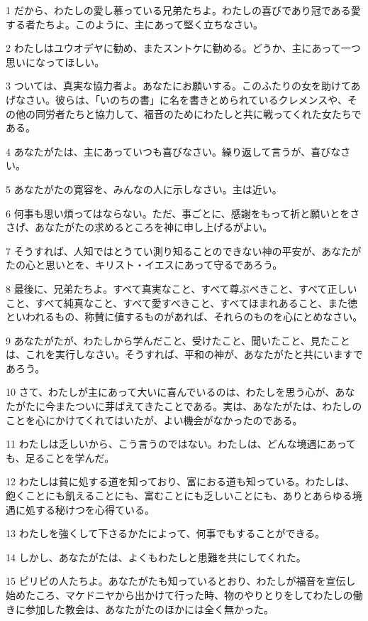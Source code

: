 \par 1 だから、わたしの愛し慕っている兄弟たちよ。わたしの喜びであり冠である愛する者たちよ。このように、主にあって堅く立ちなさい。
\par 2 わたしはユウオデヤに勧め、またスントケに勧める。どうか、主にあって一つ思いになってほしい。
\par 3 ついては、真実な協力者よ。あなたにお願いする。このふたりの女を助けてあげなさい。彼らは、「いのちの書」に名を書きとめられているクレメンスや、その他の同労者たちと協力して、福音のためにわたしと共に戦ってくれた女たちである。
\par 4 あなたがたは、主にあっていつも喜びなさい。繰り返して言うが、喜びなさい。
\par 5 あなたがたの寛容を、みんなの人に示しなさい。主は近い。
\par 6 何事も思い煩ってはならない。ただ、事ごとに、感謝をもって祈と願いとをささげ、あなたがたの求めるところを神に申し上げるがよい。
\par 7 そうすれば、人知ではとうてい測り知ることのできない神の平安が、あなたがたの心と思いとを、キリスト・イエスにあって守るであろう。
\par 8 最後に、兄弟たちよ。すべて真実なこと、すべて尊ぶべきこと、すべて正しいこと、すべて純真なこと、すべて愛すべきこと、すべてほまれあること、また徳といわれるもの、称賛に値するものがあれば、それらのものを心にとめなさい。
\par 9 あなたがたが、わたしから学んだこと、受けたこと、聞いたこと、見たことは、これを実行しなさい。そうすれば、平和の神が、あなたがたと共にいますであろう。
\par 10 さて、わたしが主にあって大いに喜んでいるのは、わたしを思う心が、あなたがたに今またついに芽ばえてきたことである。実は、あなたがたは、わたしのことを心にかけてくれてはいたが、よい機会がなかったのである。
\par 11 わたしは乏しいから、こう言うのではない。わたしは、どんな境遇にあっても、足ることを学んだ。
\par 12 わたしは貧に処する道を知っており、富におる道も知っている。わたしは、飽くことにも飢えることにも、富むことにも乏しいことにも、ありとあらゆる境遇に処する秘けつを心得ている。
\par 13 わたしを強くして下さるかたによって、何事でもすることができる。
\par 14 しかし、あなたがたは、よくもわたしと患難を共にしてくれた。
\par 15 ピリピの人たちよ。あなたがたも知っているとおり、わたしが福音を宣伝し始めたころ、マケドニヤから出かけて行った時、物のやりとりをしてわたしの働きに参加した教会は、あなたがたのほかには全く無かった。
